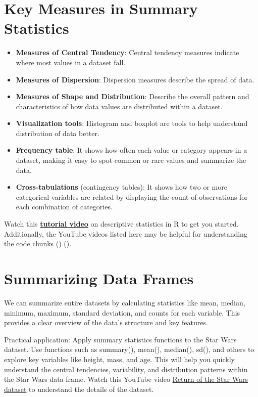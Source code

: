 \documentclass[
  man,
  floatsintext,
  longtable,
  nolmodern,
  notxfonts,
  notimes,
  colorlinks=true,linkcolor=blue,citecolor=blue,urlcolor=blue]{apa7}
\providecommand{\tightlist}{%
  \setlength{\itemsep}{0pt}\setlength{\parskip}{0pt}}
\begin{document}
\newpage

\section{Key Measures in Summary
Statistics}\label{key-measures-in-summary-statistics}

\begin{itemize}
\tightlist
\item
  \textbf{Measures of Central Tendency}: Central tendency measures
  indicate where most values in a dataset fall.
\item
  \textbf{Measures of Dispersion}: Dispersion measures describe the
  spread of data.
\item
  \textbf{Measures of Shape and Distribution}: Describe the overall
  pattern and characteristics of how data values are distributed within
  a dataset.
\item
  \textbf{Visualization tools}: Histogram and boxplot are tools to help
  understand distribution of data better.
\item
  \textbf{Frequency table}: It shows how often each value or category
  appears in a dataset, making it easy to spot common or rare values and
  summarize the data.
\item
  \textbf{Cross-tabulations} (contingency tables): It shows how two or
  more categorical variables are related by displaying the count of
  observations for each combination of categories.
\end{itemize}

Watch this
\href{https://www.youtube.com/watch?v=yoPGwvUzjgQ}{\textbf{tutorial
video}} on descriptive statistics in R to get you started. Additionally,
the YouTube videos listed here may be helpful for understanding the code
chunks ()
().

\vspace{1cm}

\section{Summarizing Data Frames}\label{summarizing-data-frames}

We can summarize entire datasets by calculating statistics like mean,
median, minimum, maximum, standard deviation, and counts for each
variable. This provides a clear overview of the data's structure and key
features.

Practical application: Apply summary statistics functions to the Star
Wars dataset. Use functions such as summary(), mean(), median(), sd(),
and others to explore key variables like height, mass, and age. This
will help you quickly understand the central tendencies, variability,
and distribution patterns within the Star Wars data frame. Watch this
YouTube video \href{https://www.youtube.com/watch?v=4vSfbz9YMa0}{Return
of the Star Wars dataset} to understand the details of the dataset.
\end{document}
